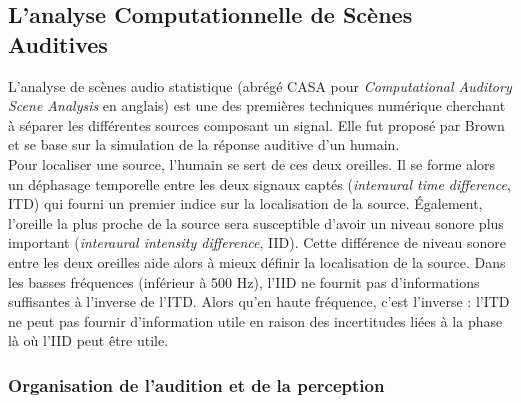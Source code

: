 \subsection{L'analyse Computationnelle de Scènes Auditives }

L'analyse de scènes audio statistique (abrégé CASA pour \textit{Computational Auditory Scene Analysis} en anglais) est une des premières techniques numérique cherchant à séparer les différentes sources composant un signal. Elle fut proposé par Brown \cite{BrownCASA} et se base sur la simulation de la réponse auditive d'un humain.\\



%
%

Pour localiser une source, l'humain se sert de ces deux oreilles. Il se forme alors un déphasage temporelle entre les deux signaux captés (\textit{interaural time difference}, ITD) qui fourni un premier indice sur la localisation de la source. Également, l'oreille la plus proche de la source sera susceptible d'avoir un niveau sonore plus important (\textit{interaural intensity difference}, IID). Cette différence de niveau sonore entre les deux oreilles aide alors à mieux définir la localisation de la source. Dans les basses fréquences (inférieur à 500 Hz), l'IID ne fournit pas d'informations suffisantes à l'inverse de l'ITD. Alors qu'en haute fréquence, c'est l'inverse : l'ITD ne peut pas fournir d'information utile en raison des incertitudes liées à la phase là où l'IID peut être utile.\\



\subsubsection{Organisation de l'audition et de la perception}
  

